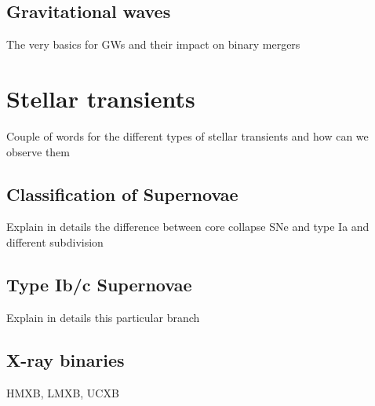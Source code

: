 \documentclass[../../main/thesis_msc.tex]{subfiles}
\begin{document}
			\subsection{Gravitational waves}
			
				The very basics for GWs and their impact on binary mergers
				
	\section{Stellar transients}
	
		Couple of words for the different types of stellar transients and how can we observe them
		
			\subsection{Classification of Supernovae}
			
				Explain in details the difference between core collapse SNe and type Ia and different subdivision
				
			\subsection{Type Ib/c Supernovae}
			
				Explain in details this particular branch
				
			\subsection{X-ray binaries}
			
				HMXB, LMXB, UCXB
    
    
    
\end{document}
